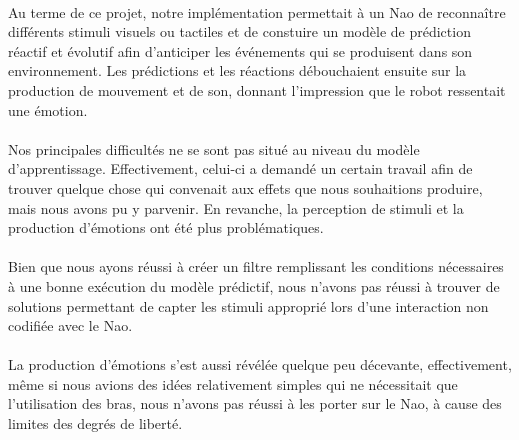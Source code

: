 \paragraph{}
Au terme de ce projet, notre implémentation permettait à un Nao de
reconnaître différents stimuli visuels ou tactiles et de constuire un
modèle de prédiction réactif et évolutif afin d'anticiper les événements qui
se produisent dans son environnement. Les prédictions et les réactions
débouchaient ensuite sur la production de mouvement et de son, donnant
l'impression que le robot ressentait une émotion.

\paragraph{}
Nos principales difficultés ne se sont pas situé au niveau du modèle
d'apprentissage. Effectivement, celui-ci a demandé un certain travail afin
de trouver quelque chose qui convenait aux effets que nous souhaitions
produire, mais nous avons pu y parvenir. En revanche, la perception de
stimuli et la production d'émotions ont été plus problématiques. 

\paragraph{}
Bien que nous ayons réussi à créer un filtre remplissant les conditions
nécessaires à une bonne exécution du modèle prédictif, nous n'avons pas
réussi à trouver de solutions permettant de capter les stimuli approprié
lors d'une interaction non codifiée avec le Nao.

\paragraph{}
La production d'émotions s'est aussi révélée quelque peu décevante,
effectivement, même si nous avions des idées relativement simples qui ne
nécessitait que l'utilisation des bras, nous n'avons pas réussi à les porter
sur le Nao, à cause des limites des degrés de liberté.
